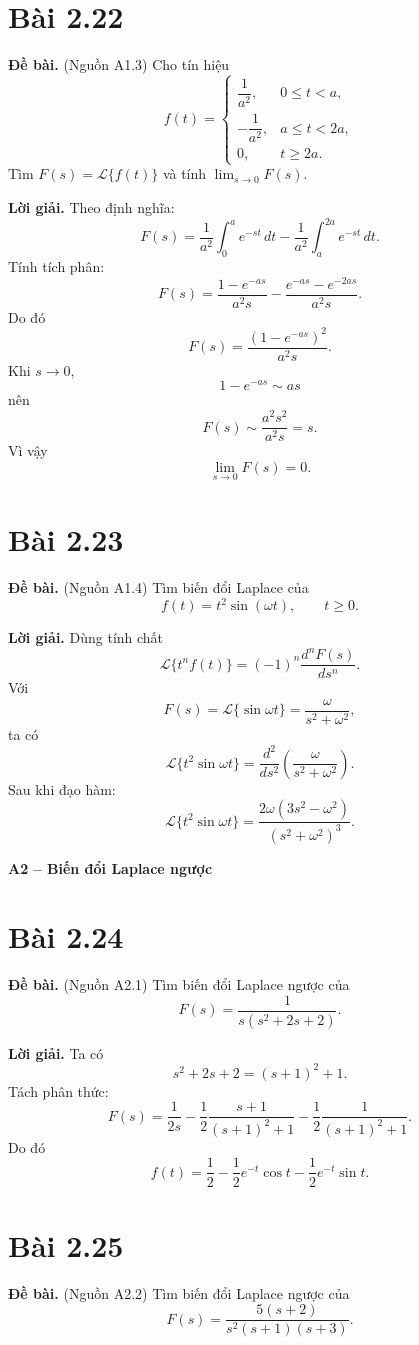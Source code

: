 \documentclass[11pt,a4paper]{article}
\newcommand{\baitap}[1]{%
  \Needspace{4\baselineskip}%
  \section*{Bài #1}%
}
\newcommand{\debai}{\par\noindent\textbf{Đề bài.}\enspace}
\newcommand{\loigiai}{\par\smallskip\noindent\textbf{Lời giải.}\enspace}
\newcommand{\Lap}{\mathcal{L}}
\begin{document}
\baitap{2.22}
\debai
(Nguồn A1.3) Cho tín hiệu
\[
f(t)=
\begin{cases}
\dfrac1{a^2},&0\le t<a,\\[1mm]
-\dfrac1{a^2},&a\le t<2a,\\[1mm]
0,&t\ge2a.
\end{cases}
\]
Tìm \(F(s)=\Lap\{f(t)\}\) và tính
\(\displaystyle \lim_{s\to0}F(s)\).

\begin{center}
\end{center}

\loigiai
Theo định nghĩa:
\[
F(s)
=
\frac1{a^2}\int_0^a e^{-st}\,dt
-\frac1{a^2}\int_a^{2a}e^{-st}\,dt.
\]
Tính tích phân:
\[
F(s)
=
\frac{1-e^{-as}}{a^2s}
-\frac{e^{-as}-e^{-2as}}{a^2s}.
\]
Do đó
\[
\boxed{
F(s)=
\frac{(1-e^{-as})^2}{a^2s}.
}
\]
Khi \(s\to0\),
\[
1-e^{-as}\sim as
\]
nên
\[
F(s)\sim\frac{a^2s^2}{a^2s}=s.
\]
Vì vậy
\[
\boxed{\lim_{s\to0}F(s)=0.}
\]

\baitap{2.23}
\debai
(Nguồn A1.4) Tìm biến đổi Laplace của
\[
f(t)=t^2\sin(\omega t),\qquad t\ge0.
\]

\loigiai
Dùng tính chất
\[
\Lap\{t^nf(t)\}=(-1)^n\frac{d^nF(s)}{ds^n}.
\]
Với
\[
F(s)=\Lap\{\sin\omega t\}=\frac{\omega}{s^2+\omega^2},
\]
ta có
\[
\Lap\{t^2\sin\omega t\}
=
\frac{d^2}{ds^2}
\left(\frac{\omega}{s^2+\omega^2}\right).
\]
Sau khi đạo hàm:
\[
\boxed{
\Lap\{t^2\sin\omega t\}
=
\frac{2\omega(3s^2-\omega^2)}
{(s^2+\omega^2)^3}.
}
\]

\textbf{A2 -- Biến đổi Laplace ngược}

\baitap{2.24}
\debai
(Nguồn A2.1) Tìm biến đổi Laplace ngược của
\[
F(s)=\frac1{s(s^2+2s+2)}.
\]

\loigiai
Ta có
\[
s^2+2s+2=(s+1)^2+1.
\]
Tách phân thức:
\[
F(s)
=
\frac{1}{2s}
-\frac12\frac{s+1}{(s+1)^2+1}
-\frac12\frac1{(s+1)^2+1}.
\]
Do đó
\[
\boxed{
f(t)=
\frac12
-\frac12e^{-t}\cos t
-\frac12e^{-t}\sin t.
}
\]

\baitap{2.25}
\debai
(Nguồn A2.2) Tìm biến đổi Laplace ngược của
\[
F(s)=
\frac{5(s+2)}
{s^2(s+1)(s+3)}.
\]
\end{document}
